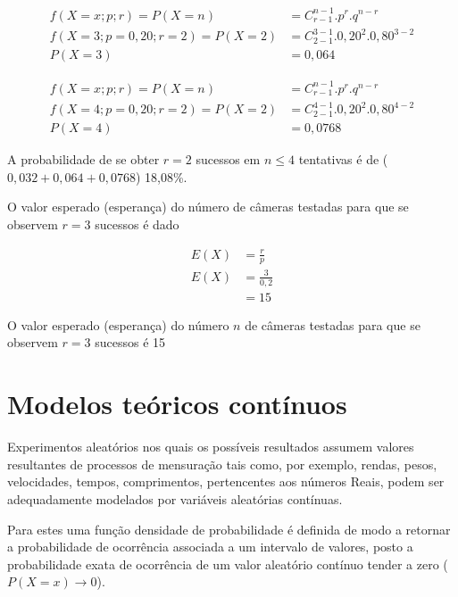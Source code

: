 \documentclass[
]{book}
\begin{document}
\hfill\break

\begin{align*}
f(X=x; p; r) = P(X=n) & = {C}_{r-1}^{n-1} . {p}^{r}. {q}^{n-r} \\
f(X=3; p=0,20 ; r=2) = P(X=2) & = {C}_{2-1}^{3-1} . {0,20}^{2}. {0,80}^{3-2} \\ 
P(X=3) & = 0,064
\end{align*}

\hfill\break

\begin{align*}
f(X=x; p; r) = P(X=n) & = {C}_{r-1}^{n-1} . {p}^{r}. {q}^{n-r} \\
f(X=4; p=0,20 ; r=2) = P(X=2) & = {C}_{2-1}^{4-1} . {0,20}^{2}. {0,80}^{4-2} \\  
P(X=4) & = 0,0768
\end{align*}

A probabilidade de se obter \(r=2\) sucessos em \(n \le 4\) tentativas é de (\(0,032+0,064+0,0768\)) 18,08\%.

\hfill\break

O valor esperado (esperança) do número de câmeras testadas para que se observem \(r=3\) sucessos é dado

\begin{align*}
E(X) &  = \frac{r}{p} \\
E(X) & = \frac{3}{0,2} \\
     & =15
\end{align*}

O valor esperado (esperança) do número \(n\) de câmeras testadas para que se observem \(r=3\) sucessos é 15

\hypertarget{modelos-teuxf3ricos-contuxednuos}{%
\section{Modelos teóricos contínuos}\label{modelos-teuxf3ricos-contuxednuos}}

Experimentos aleatórios nos quais os possíveis resultados assumem valores resultantes de processos de mensuração tais como, por exemplo, rendas, pesos, velocidades, tempos, comprimentos, pertencentes aos números Reais, podem ser adequadamente modelados por variáveis aleatórias contínuas.

\hfill\break

Para estes uma função densidade de probabilidade é definida de modo a retornar a probabilidade de ocorrência associada a um intervalo de valores, posto a probabilidade exata de ocorrência de um valor aleatório contínuo tender a zero (\(P(X=x) \to 0\)).
\end{document}
